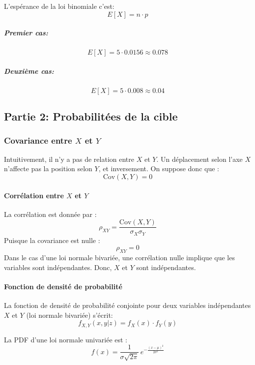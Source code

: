 \documentclass[11pt]{article}
\begin{document}
L'espérance de la loi binomiale c'est: \[
E[X]=n \cdot p
\]

\subparagraph{Premier cas:}\label{premier-cas-1}

\[
E[X]=5 \cdot 0.0156 \approx 0.078
\]

\subparagraph{Deuxième cas:}\label{deuxiuxe8me-cas-1}

\[
E[X]=5 \cdot 0.008 \approx 0.04
\]

    \subsection{Partie 2: Probabilitées de la
cible}\label{partie-2-probabilituxe9es-de-la-cible}

    \subsubsection{\texorpdfstring{Covariance entre \(X\) et
\(Y\)}{Covariance entre X et Y}}\label{covariance-entre-x-et-y}

Intuitivement, il n'y a pas de relation entre \(X\) et \(Y\). Un
déplacement selon l'axe \(X\) n'affecte pas la position selon \(Y\), et
inversement. On suppose donc que : \[
\mathrm{Cov}(X,Y) = 0
\]

\paragraph{\texorpdfstring{Corrélation entre \(X\) et
\(Y\)}{Corrélation entre X et Y}}\label{corruxe9lation-entre-x-et-y}

La corrélation est donnée par : \[
\rho_{XY}=\frac{\mathrm{Cov}(X,Y)}{\sigma_X \sigma_Y}
\] Puisque la covariance est nulle : \[
\rho_{XY} = 0
\] Dans le cas d'une loi normale bivariée, une corrélation nulle
implique que les variables sont indépendantes. Donc, \(X\) et \(Y\) sont
indépendantes.

\paragraph{Fonction de densité de
probabilité}\label{fonction-de-densituxe9-de-probabilituxe9}

La fonction de densité de probabilité conjointe pour deux variables
indépendantes \(X\) et \(Y\) (loi normale bivariée) s'écrit: \[
f_{X,Y}(x,y|z) = f_X(x) \cdot f_Y(y)
\]

La PDF d'une loi normale univariée est : \[
f(x) = \frac{1}{\sigma \sqrt{2\pi}} \, e^{-\frac{(x-\mu)^2}{2\sigma^2}}
\]
\end{document}
